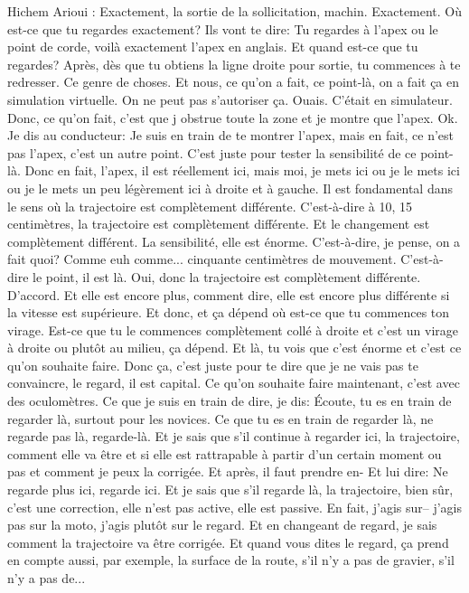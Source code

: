 Hichem Arioui : Exactement, la sortie de la sollicitation, machin. Exactement. Où est-ce que tu regardes exactement? Ils vont te dire: Tu regardes à l'apex ou le point de corde, voilà exactement l'apex en anglais. Et quand est-ce que tu regardes? Après, dès que tu obtiens la ligne droite pour sortie, tu commences à te redresser. Ce genre de choses. Et nous, ce qu'on a fait, ce point-là, on a fait ça en simulation virtuelle. On ne peut pas s'autoriser ça. Ouais. C'était en simulateur. Donc, ce qu'on fait, c'est que j obstrue toute la zone et je montre que l'apex. Ok. Je dis au conducteur: Je suis en train de te montrer l'apex, mais en fait, ce n'est pas l'apex, c'est un autre point. C'est juste pour tester la sensibilité de ce point-là. Donc en fait, l'apex, il est réellement ici, mais moi, je mets ici ou je le mets ici ou je le mets un peu légèrement ici à droite et à gauche. Il est fondamental dans le sens où la trajectoire est complètement différente. C'est-à-dire à 10, 15 centimètres, la trajectoire est complètement différente. Et le changement est complètement différent. La sensibilité, elle est énorme. C'est-à-dire, je pense, on a fait quoi? Comme euh comme... cinquante centimètres de mouvement. C'est-à-dire le point, il est là. Oui, donc la trajectoire est complètement différente. D'accord. Et elle est encore plus, comment dire, elle est encore plus différente si la vitesse est supérieure. Et donc, et ça dépend où est-ce que tu commences ton virage. Est-ce que tu le commences complètement collé à droite et c'est un virage à droite ou plutôt au milieu, ça dépend. Et là, tu vois que c'est énorme et c'est ce qu'on souhaite faire. Donc ça, c'est juste pour te dire que je ne vais pas te convaincre, le regard, il est capital. Ce qu'on souhaite faire maintenant, c'est avec des oculomètres. Ce que je suis en train de dire, je dis: Écoute, tu es en train de regarder là, surtout pour les novices. Ce que tu es en train de regarder là, ne regarde pas là, regarde-là. Et je sais que s'il continue à regarder ici, la trajectoire, comment elle va être et si elle est rattrapable à partir d'un certain moment ou pas et comment je peux la corrigée. Et après, il faut prendre en- Et lui dire: Ne regarde plus ici, regarde ici. Et je sais que s'il regarde là, la trajectoire, bien sûr, c'est une correction, elle n'est pas active, elle est passive. En fait, j'agis sur-- j'agis pas sur la moto, j'agis plutôt sur le regard. Et en changeant de regard, je sais comment la trajectoire va être corrigée. 
Et quand vous dites le regard, ça prend en compte aussi, par exemple, la surface de la route, s'il n'y a pas de gravier, s'il n'y a pas de... 
